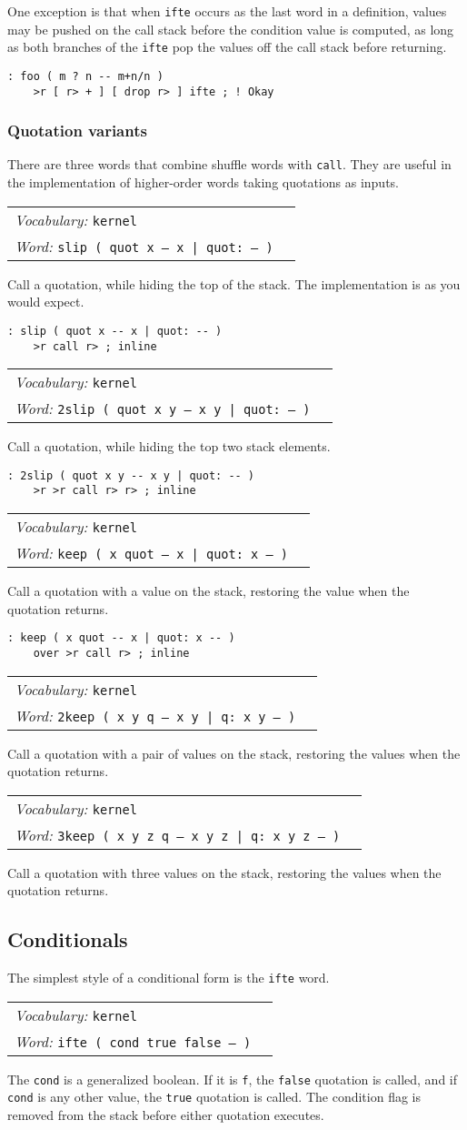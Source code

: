 \documentclass{book}
\newcommand{\vocabulary}[1]{\emph{Vocabulary:} \texttt{#1}&\\}
\newcommand{\ordinaryword}[2]{\index{\texttt{#1}}\emph{Word:} \texttt{#2}&\\}
\newcommand{\wordtable}[1]{


\begin{tabularx}{12cm}{lX}
\hline
#1
\hline
\end{tabularx}

}
\begin{document}
One exception is that when \texttt{ifte} occurs as the last word in a definition, values may be pushed on the call stack before the condition value is computed, as long as both branches of the \texttt{ifte} pop the values off the call stack before returning.
\begin{verbatim}
: foo ( m ? n -- m+n/n )
    >r [ r> + ] [ drop r> ] ifte ; ! Okay
\end{verbatim}

\subsubsection{Quotation variants}

There are three words that combine shuffle words with \texttt{call}. They are useful in the implementation of higher-order words taking quotations as inputs.
\wordtable{
\vocabulary{kernel}
\ordinaryword{slip}{slip ( quot x -- x | quot:~-- )}
}
Call a quotation, while hiding the top of the stack. The implementation is as you would expect.
\begin{verbatim}
: slip ( quot x -- x | quot: -- )
    >r call r> ; inline
\end{verbatim}
\wordtable{
\vocabulary{kernel}
\ordinaryword{2slip}{2slip ( quot x y -- x y | quot:~-- )}
}
Call a quotation, while hiding the top two stack elements.
\begin{verbatim}
: 2slip ( quot x y -- x y | quot: -- )
    >r >r call r> r> ; inline
\end{verbatim}
\wordtable{
\vocabulary{kernel}
\ordinaryword{keep}{keep ( x quot -- x | quot:~x -- )}
}
Call a quotation with a value on the stack, restoring the value when the quotation returns.
\begin{verbatim}
: keep ( x quot -- x | quot: x -- )
    over >r call r> ; inline
\end{verbatim}
\wordtable{
\vocabulary{kernel}
\ordinaryword{2keep}{2keep ( x y q -- x y | q:~x y -- )}
}
Call a quotation with a pair of values on the stack, restoring the values when the quotation returns.
\wordtable{
\vocabulary{kernel}
\ordinaryword{3keep}{3keep ( x y z q -- x y z | q:~x y z -- )}
}
Call a quotation with three values on the stack, restoring the values when the quotation returns.

\subsection{Conditionals}

The simplest style of a conditional form is the \texttt{ifte} word.
\wordtable{
\vocabulary{kernel}
\ordinaryword{ifte}{ifte ( cond true false -- )}
}
The \texttt{cond} is a generalized boolean. If it is \texttt{f}, the \texttt{false} quotation is called, and if \texttt{cond} is any other value, the \texttt{true} quotation is called. The condition flag is removed from the stack before either quotation executes.
\end{document}
